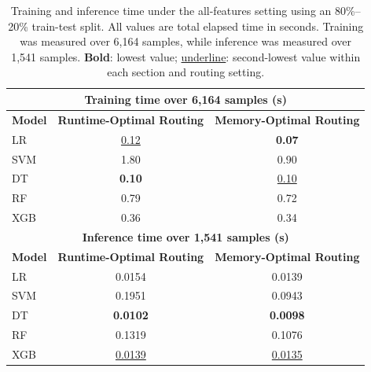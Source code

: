 \begin{table}[thb]
  \centering
  \caption{Training and inference time under the all-features setting
    using an 80\%--20\% train-test split.
    All values are total elapsed time in seconds.
    Training was measured over 6,164 samples, while inference was measured
    over 1,541 samples.
    \textbf{Bold}: lowest value;
    \underline{underline}: second-lowest value within each section and routing setting.}
  \label{tab:ablation_cost_all_features}
  \scriptsize
  \setlength{\tabcolsep}{5pt}
  \renewcommand{\arraystretch}{1.08}
  \begin{tabular}{lcc}
    \toprule
    \multicolumn{3}{c}{\textbf{Training time over 6,164 samples (s)}} \\
    \midrule
    \textbf{Model}
      & \textbf{Runtime-Optimal Routing}
      & \textbf{Memory-Optimal Routing} \\
    \midrule
    LR
      & \underline{0.12}
      & \textbf{0.07} \\
    SVM
      & 1.80
      & 0.90 \\
    DT
      & \textbf{0.10}
      & \underline{0.10} \\
    RF
      & 0.79
      & 0.72 \\
    XGB
      & 0.36
      & 0.34 \\
    \midrule
    \multicolumn{3}{c}{\textbf{Inference time over 1,541 samples (s)}} \\
    \midrule
    \textbf{Model}
      & \textbf{Runtime-Optimal Routing}
      & \textbf{Memory-Optimal Routing} \\
    \midrule
    LR
      & 0.0154
      & 0.0139 \\
    SVM
      & 0.1951
      & 0.0943 \\
    DT
      & \textbf{0.0102}
      & \textbf{0.0098} \\
    RF
      & 0.1319
      & 0.1076 \\
    XGB
      & \underline{0.0139}
      & \underline{0.0135} \\
    \bottomrule
  \end{tabular}
\end{table}
